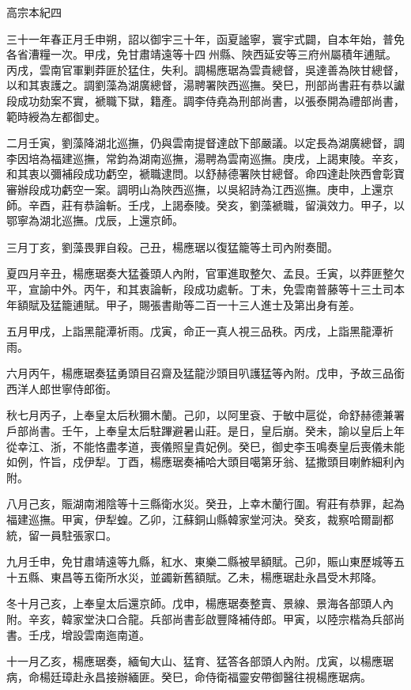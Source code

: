 
\begin{pinyinscope}
高宗本紀四

三十一年春正月壬申朔，詔以御宇三十年，函夏謐寧，寰宇式闢，自本年始，普免各省漕糧一次。甲戌，免甘肅靖遠等十四州縣、陜西延安等三府州屬積年逋賦。丙戌，雲南官軍剿莽匪於猛住，失利。調楊應琚為雲貴總督，吳達善為陜甘總督，以和其衷護之。調劉藻為湖廣總督，湯聘署陜西巡撫。癸巳，刑部尚書莊有恭以讞段成功劾案不實，褫職下獄，籍產。調李侍堯為刑部尚書，以張泰開為禮部尚書，範時綬為左都御史。

二月壬寅，劉藻降湖北巡撫，仍與雲南提督達啟下部嚴議。以定長為湖廣總督，調李因培為福建巡撫，常鈞為湖南巡撫，湯聘為雲南巡撫。庚戌，上謁東陵。辛亥，和其衷以彌補段成功虧空，褫職逮問。以舒赫德署陜甘總督。命四達赴陜西會彰寶審辦段成功虧空一案。調明山為陜西巡撫，以吳紹詩為江西巡撫。庚申，上還京師。辛酉，莊有恭論斬。壬戌，上謁泰陵。癸亥，劉藻褫職，留滇效力。甲子，以鄂寧為湖北巡撫。戊辰，上還京師。

三月丁亥，劉藻畏罪自殺。己丑，楊應琚以復猛籠等土司內附奏聞。

夏四月辛丑，楊應琚奏大猛養頭人內附，官軍進取整欠、孟艮。壬寅，以莽匪整欠平，宣諭中外。丙午，和其衷論斬，段成功處斬。丁未，免雲南普藤等十三土司本年額賦及猛籠逋賦。甲子，賜張書勛等二百一十三人進士及第出身有差。

五月甲戌，上詣黑龍潭祈雨。戊寅，命正一真人視三品秩。丙戌，上詣黑龍潭祈雨。

六月丙午，楊應琚奏猛勇頭目召齋及猛龍沙頭目叭護猛等內附。戊申，予故三品銜西洋人郎世寧侍郎銜。

秋七月丙子，上奉皇太后秋獮木蘭。己卯，以阿里袞、于敏中扈從，命舒赫德兼署戶部尚書。壬午，上奉皇太后駐蹕避暑山莊。是日，皇后崩。癸未，諭以皇后上年從幸江、浙，不能恪盡孝道，喪儀照皇貴妃例。癸巳，御史李玉鳴奏皇后喪儀未能如例，忤旨，戍伊犁。丁酉，楊應琚奏補哈大頭目噶第牙翁、猛撒頭目喇鮓細利內附。

八月己亥，賑湖南湘陰等十三縣衛水災。癸丑，上幸木蘭行圍。宥莊有恭罪，起為福建巡撫。甲寅，伊犁蝗。乙卯，江蘇銅山縣韓家堂河決。癸亥，裁察哈爾副都統，留一員駐張家口。

九月壬申，免甘肅靖遠等九縣，紅水、東樂二縣被旱額賦。己卯，賑山東歷城等五十五縣、東昌等五衛所水災，並蠲新舊額賦。乙未，楊應琚赴永昌受木邦降。

冬十月己亥，上奉皇太后還京師。戊申，楊應琚奏整賣、景線、景海各部頭人內附。辛亥，韓家堂決口合龍。兵部尚書彭啟豐降補侍郎。甲寅，以陸宗楷為兵部尚書。壬戌，增設雲南迤南道。

十一月乙亥，楊應琚奏，緬甸大山、猛育、猛答各部頭人內附。戊寅，以楊應琚病，命楊廷璋赴永昌接辦緬匪。癸巳，命侍衛福靈安帶御醫往視楊應琚病。


\end{pinyinscope}
